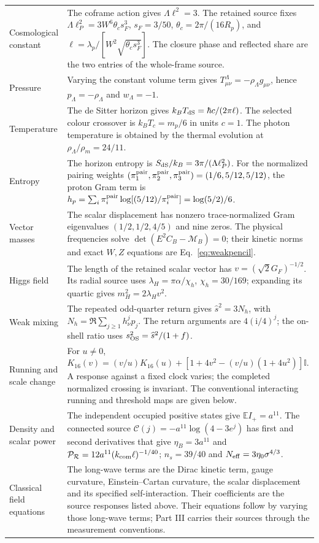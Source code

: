 \documentclass[aps,prx,onecolumn,10pt,notitlepage,nofootinbib,longbibliography]{revtex4-2}
\numberwithin{equation}{section}
\numberwithin{table}{section}
\newcommand{\Id}{\mathbb I}
\newcommand{\EE}{\mathbb E}
\newcommand{\ii}{\mathrm i}
\begin{document}
\begin{longtable}{@{}>{\raggedright\arraybackslash}p{}>{\raggedright\arraybackslash}p{}@{}}
Cosmological constant&The coframe action gives $\Lambda\ell^2=3$. The retained source fixes $\Lambda\ell_P^2=3W^6\theta_cs_F^3$, $s_F=3/50$, $\theta_c=2\pi/(16R_p)$, and $\ell=\lambda_p/[W^2\sqrt{\theta_cs_F^3}]$. The closure phase and reflected share are the two entries of the whole-frame source.\\[4pt]
Pressure&Varying the constant volume term gives $T_{\mu\nu}^{\Lambda}=-\rho_\Lambda g_{\mu\nu}$, hence $p_\Lambda=-\rho_\Lambda$ and $w_\Lambda=-1$.\\[4pt]
Temperature&The de Sitter horizon gives $k_BT_{\rm dS}=\hbar c/(2\pi\ell)$. The selected colour crossover is $k_BT_c=m_p/6$ in units $c=1$. The photon temperature is obtained by the thermal evolution at $\rho_\Lambda/\rho_m=24/11$.\\[4pt]
Entropy&The horizon entropy is $S_{\rm dS}/k_B=3\pi/(\Lambda\ell_P^2)$. For the normalized pairing weights $(\pi_1^{\rm pair},\pi_2^{\rm pair},\pi_3^{\rm pair})=(1/6,5/12,5/12)$, the proton Gram term is $h_p=\sum_i\pi_i^{\rm pair}\log[(5/12)/\pi_i^{\rm pair}]=\log(5/2)/6$.\\[4pt]
Vector masses&The scalar displacement has nonzero trace-normalized Gram eigenvalues $(1/2,1/2,4/5)$ and nine zeros. The physical frequencies solve $\det(E^2C_B-\mathcal M_B)=0$; their kinetic norms and exact $W,Z$ equations are Eq.~\eqref{eq:weakpencil}.\\[4pt]
Higgs field&The length of the retained scalar vector has $v=(\sqrt2G_F)^{-1/2}$. Its radial source uses $\lambda_H=\pi\alpha/\chi_h$, $\chi_h=30/169$; expanding its quartic gives $m_H^2=2\lambda_Hv^2$.\\[4pt]
Weak mixing&The repeated odd-quarter return gives $\widehat s^2=3N_h$, with $N_h=\Re\sum_{j\ge1}h_\nu^jp_j$. The return arguments are $4(\ii/4)^j$; the on-shell ratio uses $s_{\rm OS}^2=\widehat s^2/(1+f)$.\\[4pt]
Running and scale change&For $u\ne0$, $K_{16}(v)=(v/u)K_{16}(u)+[1+4v^2-(v/u)(1+4u^2)]\Id$. A response against a fixed clock varies; the completed normalized crossing is invariant. The conventional interacting running and threshold maps are given below.\\[4pt]
Density and scalar power&The independent occupied positive states give $\EE I_+=a^{11}$. The connected source $\mathcal C(j)=-a^{11}\log(4-3e^j)$ has first and second derivatives that give $\eta_B=3a^{11}$ and $\mathcal P_{\mathcal R}=12a^{11}(k_{\rm com}\ell)^{-1/40}$; $n_s=39/40$ and $N_{\rm eff}=3\eta_0\sigma^{4/3}$.\\[4pt]
Classical field equations&The long-wave terms are the Dirac kinetic term, gauge curvature, Einstein--Cartan curvature, the scalar displacement and its specified self-interaction. Their coefficients are the source responses listed above. Their equations follow by varying those long-wave terms; Part III carries their sources through the measurement conventions.\\
\end{longtable}
\endgroup
\end{document}

